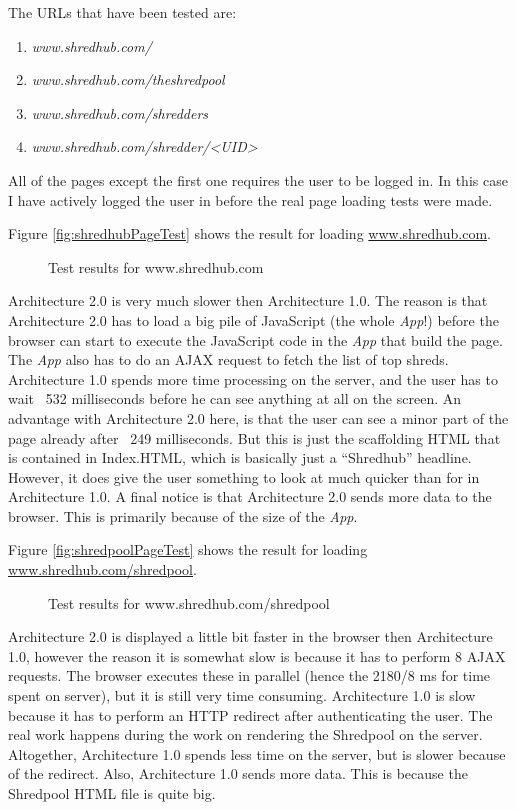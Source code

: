 The URLs that have been tested are:
\begin{enumerate}
\item \textit{www.shredhub.com/}
\item \textit{www.shredhub.com/theshredpool}
\item \textit{www.shredhub.com/shredders}
\item \textit{www.shredhub.com/shredder/<UID>}
\end{enumerate}
All of the pages except the first one requires the user to be logged in. In this case I have actively logged the user in before the real page loading tests were made. 

Figure \vref{fig:shredhubPageTest} shows the result for loading \url{www.shredhub.com}.
\begin{figure}
\begin{center}
\end{center}
\caption{Test results for www.shredhub.com}
\label{fig:shredhubPageTest}
\end{figure}
Architecture 2.0 is very much slower then Architecture 1.0. The reason is that Architecture 2.0 has to load a big pile of JavaScript (the whole \textit{App}!) before the browser can start to execute the JavaScript code in the \textit{App} that build the page. The \textit{App} also has to do an AJAX request to fetch the list of top shreds. Architecture 1.0 spends more time processing on the server, and the user has to wait ~532 milliseconds before he can see anything at all on the screen. An advantage with Architecture 2.0 here, is that the user can see a minor part of the page already after ~249 milliseconds. But this is just the scaffolding HTML that is contained in Index.HTML, which is basically just a ``Shredhub'' headline. However, it does give the user something to look at much quicker than for in Architecture 1.0. A final notice is that Architecture 2.0 sends more data to the browser. This is primarily because of the size of the \textit{App}.

Figure \vref{fig:shredpoolPageTest}
shows the result for loading
 \url{www.shredhub.com/shredpool}.
\begin{figure}
\begin{center}
\end{center}
\caption{Test results for www.shredhub.com/shredpool}\label{fig:shredpoolPageTest}
\end{figure}
Architecture 2.0 is displayed a little bit faster in the browser then Architecture 1.0, however the reason it is somewhat slow is because it has to perform 8 AJAX requests. The browser executes these in parallel (hence the 2180/8 ms for time spent on server), but it is still very time consuming. Architecture 1.0 is slow because it has to perform an HTTP redirect after authenticating the user. The real work happens during the work on rendering the Shredpool on the server. Altogether, Architecture 1.0 spends less time on the server, but is slower because of the redirect. Also, Architecture 1.0 sends more data. This is because the Shredpool HTML file is quite big.

